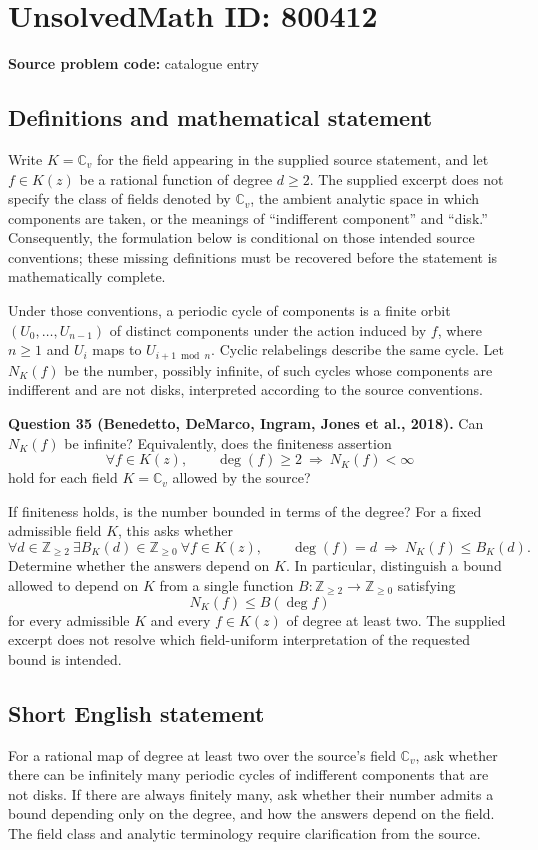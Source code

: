 \documentclass[11pt]{article}
\begin{document}
\section*{UnsolvedMath ID: 800412}
\textbf{Source problem code:} catalogue entry
\subsection{Definitions and mathematical statement}
Write \(K=\mathbb{C}_v\) for the field appearing in the supplied source statement, and let \(f\in K(z)\) be a rational function of degree \(d\geq 2\). The supplied excerpt does not specify the class of fields denoted by \(\mathbb{C}_v\), the ambient analytic space in which components are taken, or the meanings of ``indifferent component'' and ``disk.'' Consequently, the formulation below is conditional on those intended source conventions; these missing definitions must be recovered before the statement is mathematically complete.

Under those conventions, a periodic cycle of components is a finite orbit \((U_0,\ldots,U_{n-1})\) of distinct components under the action induced by \(f\), where \(n\geq 1\) and \(U_i\) maps to \(U_{i+1\bmod n}\). Cyclic relabelings describe the same cycle. Let \(N_K(f)\) be the number, possibly infinite, of such cycles whose components are indifferent and are not disks, interpreted according to the source conventions.

\textbf{Question 35 (Benedetto, DeMarco, Ingram, Jones et al., 2018).} Can \(N_K(f)\) be infinite? Equivalently, does the finiteness assertion
\[
\forall f\in K(z),\qquad \deg(f)\geq 2\ \Longrightarrow\ N_K(f)<\infty
\]
hold for each field \(K=\mathbb{C}_v\) allowed by the source?

If finiteness holds, is the number bounded in terms of the degree? For a fixed admissible field \(K\), this asks whether
\[
\forall d\in\mathbb{Z}_{\geq 2}\ \exists B_K(d)\in\mathbb{Z}_{\geq 0}\ \forall f\in K(z),\qquad
\deg(f)=d\ \Longrightarrow\ N_K(f)\leq B_K(d).
\]
Determine whether the answers depend on \(K\). In particular, distinguish a bound allowed to depend on \(K\) from a single function \(B\colon\mathbb{Z}_{\geq 2}\to\mathbb{Z}_{\geq 0}\) satisfying
\[
N_K(f)\leq B(\deg f)
\]
for every admissible \(K\) and every \(f\in K(z)\) of degree at least two. The supplied excerpt does not resolve which field-uniform interpretation of the requested bound is intended.
\subsection{Short English statement}
For a rational map of degree at least two over the source's field \(\mathbb{C}_v\), ask whether there can be infinitely many periodic cycles of indifferent components that are not disks. If there are always finitely many, ask whether their number admits a bound depending only on the degree, and how the answers depend on the field. The field class and analytic terminology require clarification from the source.
\end{document}
